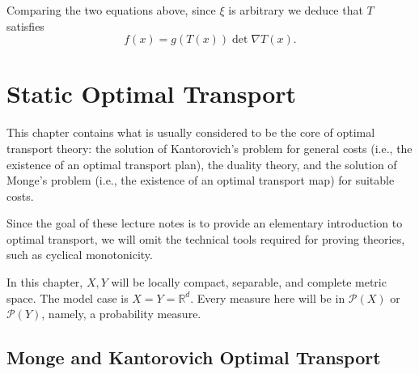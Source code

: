 \documentclass[11pt]{book}
\begin{document}
Comparing the two equations above, since \( \xi \) is arbitrary we deduce that \( T \) satisfies
\[
f(x) = g(T(x)) \det \nabla T(x) .
\]








































\chapter[Static OT]{Static Optimal Transport}\label{chapter:SOT}


This chapter contains what is usually considered to be the core of optimal transport theory: the solution of Kantorovich's problem for general costs (i.e., the existence of an optimal transport plan), the duality theory, and the solution of Monge's problem (i.e., the existence of an optimal transport map) for suitable costs. 

Since the goal of these lecture notes is to provide an elementary introduction to optimal transport, we will omit the technical tools required for proving theories, such as cyclical monotonicity.

In this chapter, $X, Y$ will be locally compact, separable, and complete metric space. The model case is $X=Y=\mathbb{R}^d$. Every measure here will be in $\mathcal{P}(X)$ or $\mathcal{P}(Y)$, namely, a probability measure.



\section[Monge v.s. Kantorovich]{Monge and Kantorovich Optimal Transport}
\end{document}
